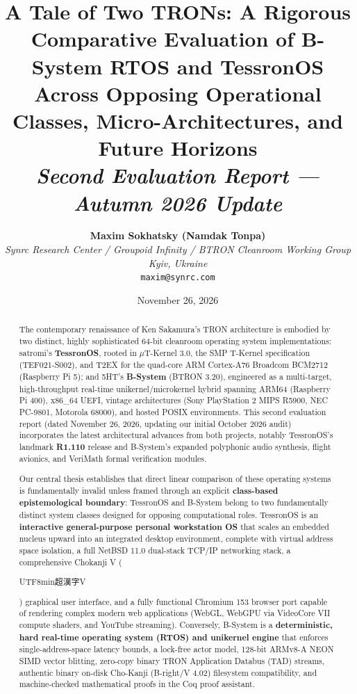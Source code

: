 \documentclass[10pt,journal,compsoc,twocolumn]{article}
\title{\LARGE \textbf{A Tale of Two TRONs: A Rigorous Comparative Evaluation of B-System RTOS and TessronOS Across Opposing Operational Classes, Micro-Architectures, and Future Horizons}\\[0.3em]
\large \textit{Second Evaluation Report --- Autumn 2026 Update}}
\author{
    \textbf{Maxim Sokhatsky (Namdak Tonpa)}\\[0.3em]
    \small \textit{Synrc Research Center / Groupoid Infinity / BTRON Cleanroom Working Group}\\
    \small \textit{Kyiv, Ukraine}\\
    \small \texttt{maxim@synrc.com}
}
\date{November 26, 2026}
\newcommand{\ja}[1]{\begin{CJK*}{UTF8}{min}#1\end{CJK*}}
\begin{document}
\maketitle

\begin{abstract}
The contemporary renaissance of Ken Sakamura's TRON architecture is embodied by two distinct, highly sophisticated 64-bit cleanroom operating system implementations: satromi's \textbf{TessronOS}, rooted in $\mu$T-Kernel 3.0, the SMP T-Kernel specification (TEF021-S002), and T2EX for the quad-core ARM Cortex-A76 Broadcom BCM2712 (Raspberry Pi 5); and 5HT's \textbf{B-System} (BTRON 3.20), engineered as a multi-target, high-throughput real-time unikernel/microkernel hybrid spanning ARM64 (Raspberry Pi 400), x86\_64 UEFI, vintage architectures (Sony PlayStation 2 MIPS R5900, NEC PC-9801, Motorola 68000), and hosted POSIX environments. This second evaluation report (dated November 26, 2026, updating our initial October 2026 audit) incorporates the latest architectural advances from both projects, notably TessronOS's landmark \textbf{R1.110} release and B-System's expanded polyphonic audio synthesis, flight avionics, and VeriMath formal verification modules.

Our central thesis establishes that direct linear comparison of these operating systems is fundamentally invalid unless framed through an explicit \textbf{class-based epistemological boundary}: TessronOS and B-System belong to two fundamentally distinct system classes designed for opposing computational roles. TessronOS is an \textbf{interactive general-purpose personal workstation OS} that scales an embedded nucleus upward into an integrated desktop environment, complete with virtual address space isolation, a full NetBSD 11.0 dual-stack TCP/IP networking stack, a comprehensive Chokanji V (\ja{超漢字V}) graphical user interface, and a fully functional Chromium 153 browser port capable of rendering complex modern web applications (WebGL, WebGPU via VideoCore VII compute shaders, and YouTube streaming). Conversely, B-System is a \textbf{deterministic, hard real-time operating system (RTOS) and unikernel engine} that enforces single-address-space latency bounds, a lock-free actor model, 128-bit ARMv8-A NEON SIMD vector blitting, zero-copy binary TRON Application Databus (TAD) streams, authentic binary on-disk Cho-Kanji (B-right/V 4.02) filesystem compatibility, and machine-checked mathematical proofs in the Coq proof assistant.


\end{abstract}
\end{document}
